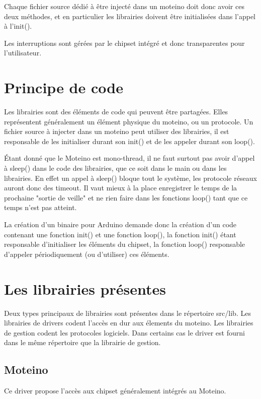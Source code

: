 \documentclass{report}
\begin{document}
Chaque fichier source dédié à être injecté dans un moteino doit donc avoir ces deux méthodes, et en particulier les librairies doivent être initialisées dans l'appel à l'init().

Les interruptions sont gérées par le chipset intégré et donc transparentes pour l'utilisateur.

\section{Principe de code}

Les librairies sont des éléments de code qui peuvent être partagées. Elles représentent généralement un élément physique du moteino, ou un protocole.
Un fichier source à injecter dans un moteino peut utiliser des librairies, il est responsable de les initialiser durant son init() et de les appeler durant son loop().

Étant donné que le Moteino est mono-thread, il ne faut surtout pas avoir d'appel à sleep() dans le code des librairies, que ce soit dans le main ou dans les librairies. En effet un appel à sleep() bloque tout le système, les protocole réseaux auront donc des timeout. Il vaut mieux à la place enregistrer le temps de la prochaine "sortie de veille" et ne rien faire dans les fonctions loop() tant que ce temps n'est pas atteint.

La création d'un binaire pour Arduino demande donc la création d'un code contenant une fonction init() et une fonction loop(), la fonction init() étant responsable d'initialiser les éléments du chipset, la fonction loop() responsable d'appeler périodiquement (ou d'utiliser) ces éléments.

\section{Les librairies présentes}

Deux types principaux de librairies sont présentes dans le répertoire src/lib. Les librairies de drivers codent l'accès en dur aux élements du moteino. Les librairies de gestion codent les protocoles logiciels. Dans certains cas le driver est fourni dans le même répertoire que la librairie de gestion.

\subsection{Moteino}

Ce driver propose l'accès aux chipset généralement intégrés au Moteino.
\end{document}
